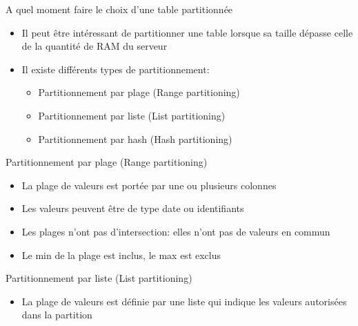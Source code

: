 
\begin{frame}[fragile]{A quel moment faire le choix d'une table partitionnée}

   \begin{itemize}
      \item Il peut être intéressant de partitionner une table lorsque sa taille dépasse celle de la quantité de RAM du serveur
      \item Il existe différents types de partitionnement:
      \begin{itemize}
         \item Partitionnement par plage (Range partitioning)
         \item Partitionnement par liste (List partitioning)
         \item Partitionnement par hash (Hash partitioning)
      \end{itemize}

   \end{itemize}

\end{frame}


\begin{frame}[fragile]{Partitionnement par plage (Range partitioning)}

   \begin{itemize}
      \item La plage de valeurs est portée par une ou plusieurs colonnes
      \item Les valeurs peuvent être de type date ou identifiants
      \item Les plages n'ont pas d'intersection: elles n'ont pas de valeurs en commun
      \item Le min de la plage est inclus, le max est exclus
   \end{itemize}

\end{frame}


\begin{frame}[fragile]{Partitionnement par liste (List partitioning)}

   \begin{itemize}
      \item La plage de valeurs est définie par une liste qui indique les valeurs autorisées dans la partition
   \end{itemize}

\end{frame}

